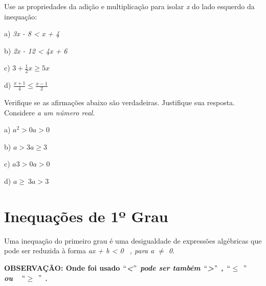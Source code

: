 \begin{exercicios}
	\exitem{} Use as propriedades da adição e multiplicação para isolar \textit{x} do lado esquerdo da inequação: 

    a) \textit{3x - 8 < x + 4}

    b) \textit{2x - 12 < 4x + 6}
    
    c) \( 3+\frac{1}{2}x \geq 5x \)
    
    d) \( \frac{x+1}{4} \leq \frac{x-1}{2} \)

\item Verifique se as afirmações abaixo são verdadeiras. Justifique sua resposta. Considere \textit{a um número real.}

a) $a^{2} > 0  a > 0$

b) $a > 3  a \geq 3$

c) $a3 > 0  a > 0$

d) $a \geq ~3 a > 3$

\end{exercicios}

\section{Inequações de 1º Grau}

\begin{caixa}

\begin {tdefinicao}
Uma inequação do primeiro grau é uma desigualdade de expressões algébricas que pode ser reduzida à forma
\textit{ax + b < 0~ , para a $ \neq $  0. }

\textbf{OBSERVAÇÃO: Onde foi usado\textit{ $``$<$"$  pode ser também $``$>$"$ , $``$$ \leq $ $"$ ~ ou~~$``$$ \geq $ $"$  .  }}
\end{tdefinicao}
\end{caixa}

